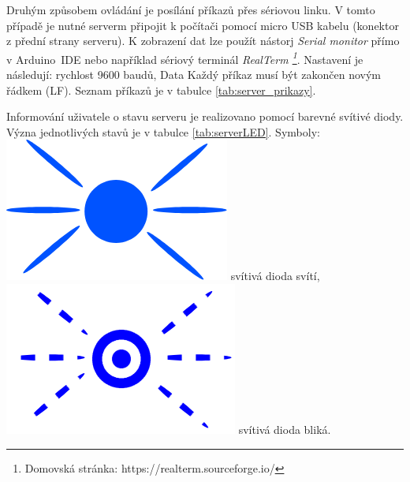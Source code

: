 Druhým způsobem ovládání je posílání příkazů přes sériovou linku. V tomto případě je nutné serverm připojit k počítači pomocí micro USB kabelu (konektor z přední strany serveru). K zobrazení dat lze použít nástorj \textit{Serial monitor} přímo v Arduino~IDE nebo například sériový terminál \textit{RealTerm \footnote{Domovská stránka: https://realterm.sourceforge.io/}}. Nastavení je následují: rychlost 9600 baudů, Data  Každý příkaz musí být zakončen novým řádkem (LF). Seznam příkazů je v tabulce \ref{tab:server_prikazy}.

Informování uživatele o stavu serveru je realizovano pomocí barevné svítivé diody. Význa jednotlivých stavů je v tabulce \ref{tab:serverLED}. Symboly: \includegraphics[height=.4cm]{img/manual/blue.png} svítivá dioda svítí, \includegraphics[height=.4cm]{img/manual/blue_blink.png} svítivá dioda bliká.





